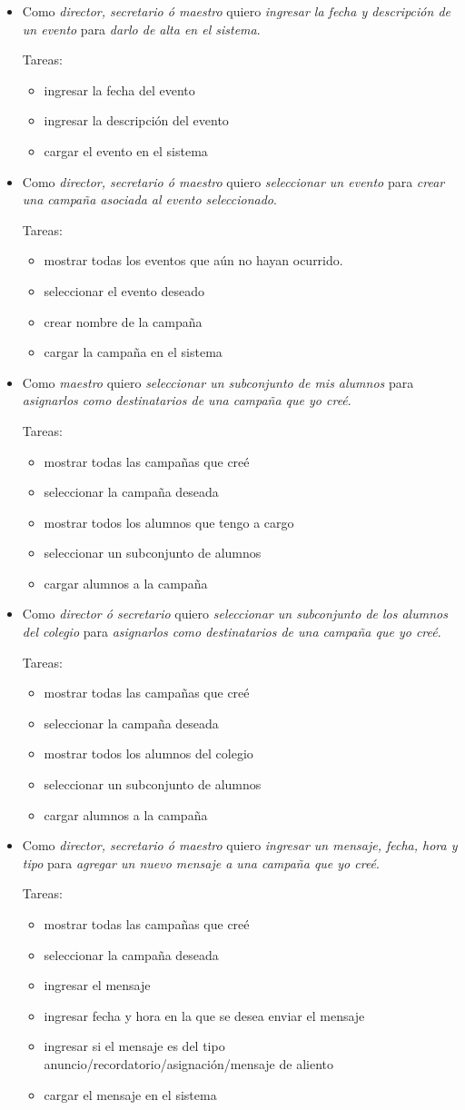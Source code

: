 \documentclass[a4paper, 10pt, twoside]{article}
\newenvironment{stories}{
  \begin{itemize}
}{
  \end{itemize}
}
\newcommand{\story}[3]{
  \item
  Como \emph{#1} quiero \emph{#2} para \emph{#3}.
}
\newenvironment{tasks}{
  Tareas:
  \begin{itemize}
}{
  \end{itemize}
}
\newcommand{\task}[1] {
  \item #1
}
\begin{document}
\begin{stories}
  \story{director, secretario ó maestro}
        {ingresar la fecha y descripción de un evento}
        {darlo de alta en el sistema}

  \begin{tasks}
    \task{ingresar la fecha del evento}
    \task{ingresar la descripción del evento}
    \task{cargar el evento en el sistema}
  \end{tasks}

  \story{director, secretario ó maestro}
        {seleccionar un evento}
        {crear una campaña asociada al evento seleccionado}

  \begin{tasks}
    \task{mostrar todas los eventos que aún no hayan ocurrido.}
    \task{seleccionar el evento deseado}
    \task{crear nombre de la campaña}
    \task{cargar la campaña en el sistema}
  \end{tasks}

  \story{maestro}
        {seleccionar un subconjunto de mis alumnos}
        {asignarlos como destinatarios de una campaña que yo creé}

  \begin{tasks}
    \task{mostrar todas las campañas que creé}
    \task{seleccionar la campaña deseada}
    \task{mostrar todos los alumnos que tengo a cargo}
    \task{seleccionar un subconjunto de alumnos}
    \task{cargar alumnos a la campaña}
  \end{tasks}

  \story{director ó secretario}
        {seleccionar un subconjunto de los alumnos del colegio}
        {asignarlos como destinatarios de una campaña que yo creé}

  \begin{tasks}
    \task{mostrar todas las campañas que creé}
    \task{seleccionar la campaña deseada}
    \task{mostrar todos los alumnos del colegio}
    \task{seleccionar un subconjunto de alumnos}
    \task{cargar alumnos a la campaña}
  \end{tasks}

  \story{director, secretario ó maestro}
        {ingresar un mensaje, fecha, hora y tipo}
        {agregar un nuevo mensaje a una campaña que yo creé}

  \begin{tasks}
    \task{mostrar todas las campañas que creé}
    \task{seleccionar la campaña deseada}
    \task{ingresar el mensaje}
    \task{ingresar fecha y hora en la que se desea enviar el mensaje}
    \task{ingresar si el mensaje es del tipo anuncio/recordatorio/asignación/mensaje de aliento}
    \task{cargar el mensaje en el sistema}
  \end{tasks}


\end{stories}
\end{document}
